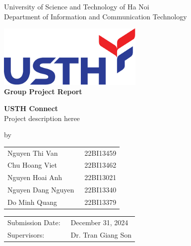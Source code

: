 \begin{center}
\thispagestyle{empty}
\LARGE{University of Science and Technology of Ha Noi}\\[-0.9ex]
\large{Department of Information and Communication Technology}\\
\vspace{0.3cm}
\begin{center}
\includegraphics[width=7cm]{image/logoUSTH.png}\\
\vspace{0.9cm}
\textbf{\LARGE{Group Project Report}}\\
\medskip\par
\vspace{1.2cm}
\Large{\textbf{USTH Connect}}\\[-0.5ex]
\large{Project description heree}\\[-1.5ex]
\bigskip\par
by \par

\begin{tabular}{ll}
  Nguyen Thi Van &\ 22BI13459\\
  Chu Hoang Viet &\ 22BI13462\\
  Nguyen Hoai Anh &\ 22BI13021\\
  Nguyen Dang Nguyen &\ 22BI13340\\
  Do Minh Quang &\ 22BI13379\\
\end{tabular}
\vspace{0.6cm}
\end{center}
\medskip
\end{center}
\begin{tabular}{ll}
  Submission Date:  &\ December 31, 2024  \\[-1ex]
  Supervisors: &\ Dr. Tran Giang Son\\
\end{tabular}